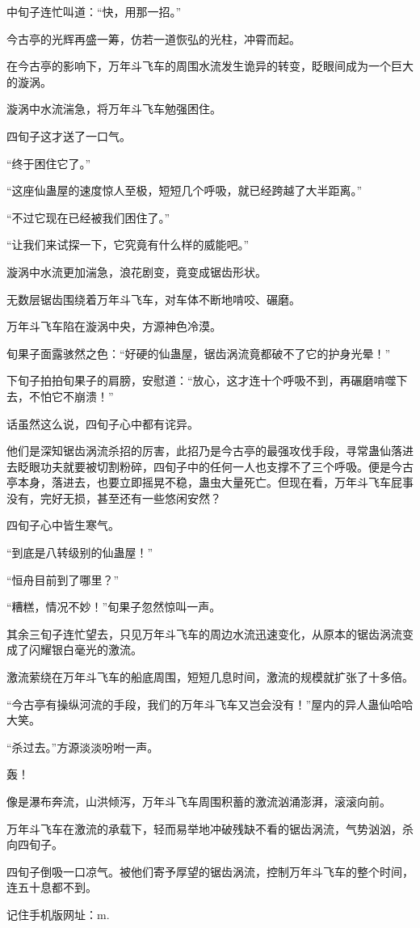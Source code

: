 \begin{this_body}
中旬子连忙叫道：“快，用那一招。”

今古亭的光辉再盛一筹，仿若一道恢弘的光柱，冲霄而起。

在今古亭的影响下，万年斗飞车的周围水流发生诡异的转变，眨眼间成为一个巨大的漩涡。

漩涡中水流湍急，将万年斗飞车勉强困住。

四旬子这才送了一口气。

“终于困住它了。”

“这座仙蛊屋的速度惊人至极，短短几个呼吸，就已经跨越了大半距离。”

“不过它现在已经被我们困住了。”

“让我们来试探一下，它究竟有什么样的威能吧。”

漩涡中水流更加湍急，浪花剧变，竟变成锯齿形状。

无数层锯齿围绕着万年斗飞车，对车体不断地啃咬、碾磨。

万年斗飞车陷在漩涡中央，方源神色冷漠。

旬果子面露骇然之色：“好硬的仙蛊屋，锯齿涡流竟都破不了它的护身光晕！”

下旬子拍拍旬果子的肩膀，安慰道：“放心，这才连十个呼吸不到，再碾磨啃噬下去，不怕它不崩溃！”

话虽然这么说，四旬子心中都有诧异。

他们是深知锯齿涡流杀招的厉害，此招乃是今古亭的最强攻伐手段，寻常蛊仙落进去眨眼功夫就要被切割粉碎，四旬子中的任何一人也支撑不了三个呼吸。便是今古亭本身，落进去，也要立即摇晃不稳，蛊虫大量死亡。但现在看，万年斗飞车屁事没有，完好无损，甚至还有一些悠闲安然？

四旬子心中皆生寒气。

“到底是八转级别的仙蛊屋！”

“恒舟目前到了哪里？”

“糟糕，情况不妙！”旬果子忽然惊叫一声。

其余三旬子连忙望去，只见万年斗飞车的周边水流迅速变化，从原本的锯齿涡流变成了闪耀银白毫光的激流。

激流萦绕在万年斗飞车的船底周围，短短几息时间，激流的规模就扩张了十多倍。

“今古亭有操纵河流的手段，我们的万年斗飞车又岂会没有！”屋内的异人蛊仙哈哈大笑。

“杀过去。”方源淡淡吩咐一声。

轰！

像是瀑布奔流，山洪倾泻，万年斗飞车周围积蓄的激流汹涌澎湃，滚滚向前。

万年斗飞车在激流的承载下，轻而易举地冲破残缺不看的锯齿涡流，气势汹汹，杀向四旬子。

四旬子倒吸一口凉气。被他们寄予厚望的锯齿涡流，控制万年斗飞车的整个时间，连五十息都不到。

记住手机版网址：m.

\end{this_body}

